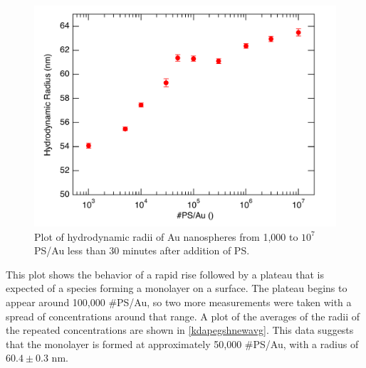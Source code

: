 \begin{figure}[htbp]
\centering
\includegraphics[keepaspectratio,width=\textwidth,height=0.75\textheight]{./ImmediateExploratory.pdf}
\caption{Plot of hydrodynamic radii of Au nanospheres from 1,000 to $10^7$ PS\slash Au less than 30 minutes after addition of PS.}
\label{kdapegshnewexpl}
\end{figure}



This plot shows the behavior of a rapid rise followed by a plateau that is expected of a species forming a monolayer on a surface. The plateau begins to appear around 100,000 \#PS\slash Au, so two more measurements were taken with a spread of concentrations around that range. A plot of the averages of the radii of the repeated concentrations are shown in \autoref{kdapegshnewavg}. This data suggests that the monolayer is formed at approximately 50,000 \#PS\slash Au, with a radius of $60.4\pm0.3$ nm.

